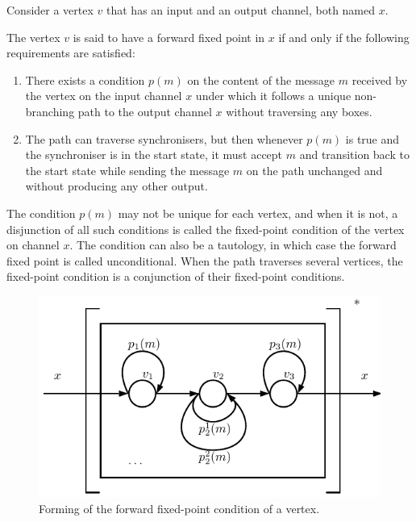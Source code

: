 Consider a vertex $v$ that has an input and an output channel, both named $x$.

\begin{definition}The vertex $v$ is said to have a forward fixed point in $x$ if and only if the following requirements are satisfied:

\begin{enumerate}
\item There exists a condition $p(m)$ on the content of the message $m$ received by the vertex on the input channel $x$ under which it follows a unique non-branching path to the output channel $x$ without traversing any boxes.

\item The path can traverse synchronisers, but then whenever $p(m)$ is true and the synchroniser is in the start state, it must accept $m$ and transition back to the start state while sending the message $m$ on the path unchanged and without producing any other output.

\end{enumerate}
\end{definition}

The condition $p(m)$ may not be unique for each vertex, and when it is not, a disjunction of all such conditions is called the fixed-point condition of the vertex on channel $x$. The condition can also be a tautology, in which case the forward fixed point is called unconditional. When the path traverses several vertices, the fixed-point condition is a conjunction of their fixed-point conditions.

  \begin{figure}[h!]
  \centering
  \includegraphics{figs/chapter_04_ffp.pdf}
  \caption{Forming of the forward fixed-point condition of a vertex.}
  \label{fig:ffp}
  \end{figure}

